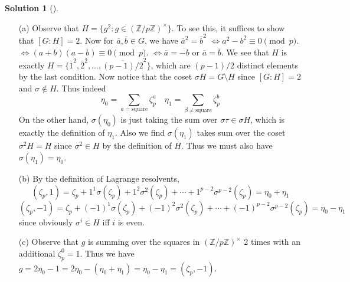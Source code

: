 \documentclass{article}
\theoremstyle{definition}
\newtheorem*{sol}{Solution}
\newenvironment{sols}[1][]{%
  \begin{sol}[#1]$ $\par\nobreak\ignorespaces
}{%
  \end{sol}
}
\newcommand{\ZZ}{\mathbb Z}
\newcommand{\Lra}{\Leftrightarrow}
\begin{document}
\begin{sols}
	\begin{enumerate}
		\item[(a)] Observe that $H = \{g^2: g \in (\ZZ/p \ZZ)^\times\}$.
			To see this, it suffices to show that $[G:H] = 2$.
			Now for $\overline{a}, \overline{b} \in G$, we have
			$\overline{a}^2 = \overline{b}^2$
			$\Lra a^2 - b^2 \equiv 0 \pmod{p}$.
			$\Lra (a + b) (a - b) \equiv 0 \pmod{p}$.
			$\Lra \overline{a} = \overline{-b}$ or $\overline{a} = \overline{b}$.
			We see that $H$ is exactly $H = \{\overline{1}^2, \overline{2}^2, ..., \overline{(p - 1)/2}^2\}$, which are $(p - 1)/2$ distinct elements by the last condition.
			Now notice that the coset $\sigma H = G \setminus H$ since $[G:H] = 2$ and $\sigma \notin H$.
			Thus indeed
			\[
				\eta_0 = \sum_{a = \text{square}} \zeta_p^a \quad \eta_1 = \sum_{\beta \neq \text{square}} \zeta_p^b
			\]
			On the other hand, $\sigma(\eta_0)$ is just taking the sum over $\sigma \tau \in \sigma H$, which is exactly the definition of $\eta_1$.
			Also we find $\sigma(\eta_1)$ takes sum over the coset $\sigma^2 H = H$ since $\sigma^2 \in H$ by the definition of $H$.
			Thus we must also have $\sigma(\eta_1) = \eta_0$.

		\item[(b)] By the definition of Lagrange resolvents,
			\[
				(\zeta_p, 1) = \zeta_p + 1^1 \sigma(\zeta_p) + 1^2 \sigma^2(\zeta_p) + \cdots + 1^{p - 2} \sigma^{p - 2}(\zeta_p)  = \eta_0 + \eta_1
			\]
			\[
				(\zeta_p, -1) = \zeta_p + (-1)^1 \sigma(\zeta_p) + (-1)^2 \sigma^2(\zeta_p) + \cdots + (-1)^{p - 2} \sigma^{p - 2}(\zeta_p) = \eta_0 - \eta_1 
			\]
			since obviously $\sigma^i \in H$ iff $i$ is even.

		\item[(c)] Observe that $g$ is summing over the squares in $(\ZZ/p \ZZ)^\times$ 2 times with an additional $\zeta_p^0 = 1$.
			Thus we have $g = 2 \eta_0 - 1 = 2 \eta_0 - (\eta_0 + \eta_1) = \eta_0 - \eta_1 = (\zeta_p, -1)$.


\end{enumerate}
\end{sols}
\end{document}
